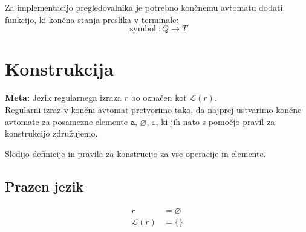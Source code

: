 \documentclass{article}
\DeclareMathOperator{\acc}{symbol}
\newcommand{\Special}[1]{\textbf{#1}}
\newcommand{\Empty}{\varnothing}
\newcommand{\Null}{\varepsilon}
\newcommand{\Language}[1]{\mathcal{L}(#1)}
\newcommand{\Char}[1]{\texttt{#1}}
\begin{document}
Za implementacijo pregledovalnika je potrebno končnemu avtomatu dodati funkcijo, ki končna stanja preslika v terminale:
\begin{equation*}
  \acc: Q \rightarrow T
\end{equation*}

\section{Konstrukcija}

\Special{Meta:} Jezik regularnega izraza $r$ bo označen kot $\Language{r}$.\\

Regularni izraz v končni avtomat pretvorimo tako, da najprej ustvarimo končne avtomate za posamezne elemente $\Char{a}$, $\Empty$, $\Null$, ki jih nato s pomočjo pravil za konstrukcijo združujemo.

%
%
%
%

Sledijo definicije in pravila za konstrucijo za vse operacije in elemente.

\subsection{Prazen jezik}
\begin{tcolorbox}[title={Definicija}]
\begin{equation*}
  \begin{aligned}
    r &= \Empty\\
    \Language{r} &= \{\}
  \end{aligned}
\end{equation*}
\end{tcolorbox}
\end{document}
